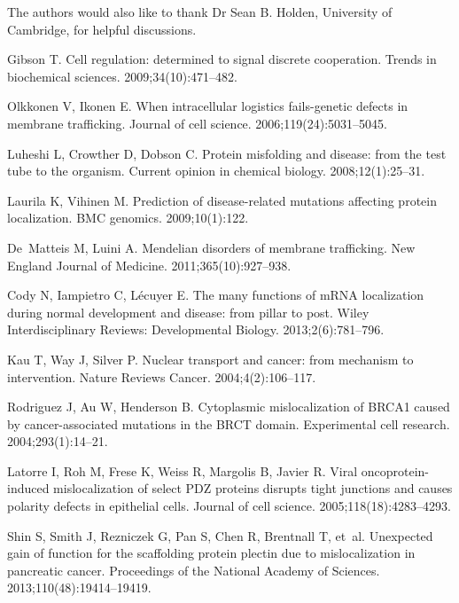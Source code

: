 \documentclass[10pt,letterpaper]{article}\usepackage[]{graphicx}\usepackage[]{color}
\begin{document}
The authors would also like to thank Dr Sean B. Holden, University of
Cambridge, for helpful discussions.


\begin{thebibliography}{10}

Gibson T.
\newblock Cell regulation: determined to signal discrete cooperation.
\newblock Trends in biochemical sciences. 2009;34(10):471--482.

Olkkonen V, Ikonen E.
\newblock When intracellular logistics fails-genetic defects in membrane
  trafficking.
\newblock Journal of cell science. 2006;119(24):5031--5045.

Luheshi L, Crowther D, Dobson C.
\newblock Protein misfolding and disease: from the test tube to the organism.
\newblock Current opinion in chemical biology. 2008;12(1):25--31.

Laurila K, Vihinen M.
\newblock Prediction of disease-related mutations affecting protein
  localization.
\newblock BMC genomics. 2009;10(1):122.

De~Matteis M, Luini A.
\newblock Mendelian disorders of membrane trafficking.
\newblock New England Journal of Medicine. 2011;365(10):927--938.

Cody N, Iampietro C, L{\'e}cuyer E.
\newblock The many functions of mRNA localization during normal development and
  disease: from pillar to post.
\newblock Wiley Interdisciplinary Reviews: Developmental Biology.
  2013;2(6):781--796.

Kau T, Way J, Silver P.
\newblock Nuclear transport and cancer: from mechanism to intervention.
\newblock Nature Reviews Cancer. 2004;4(2):106--117.

Rodriguez J, Au W, Henderson B.
\newblock Cytoplasmic mislocalization of BRCA1 caused by cancer-associated
  mutations in the BRCT domain.
\newblock Experimental cell research. 2004;293(1):14--21.

Latorre I, Roh M, Frese K, Weiss R, Margolis B, Javier R.
\newblock Viral oncoprotein-induced mislocalization of select PDZ proteins
  disrupts tight junctions and causes polarity defects in epithelial cells.
\newblock Journal of cell science. 2005;118(18):4283--4293.

Shin S, Smith J, Rezniczek G, Pan S, Chen R, Brentnall T, et~al.
\newblock Unexpected gain of function for the scaffolding protein plectin due
  to mislocalization in pancreatic cancer.
\newblock Proceedings of the National Academy of Sciences.
  2013;110(48):19414--19419.


\end{thebibliography}
\end{document}
